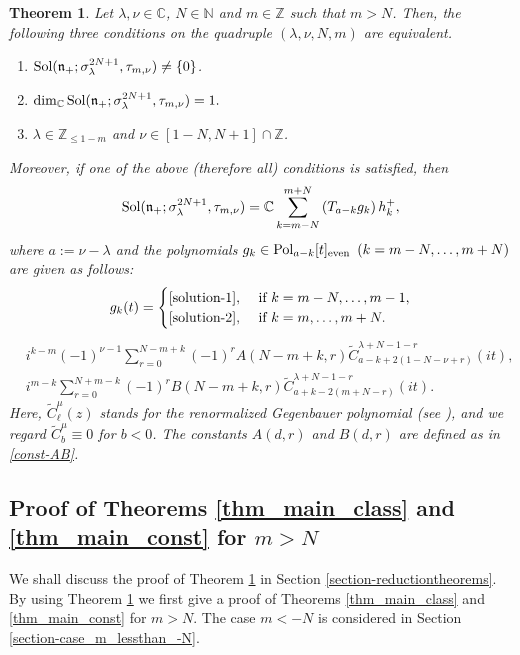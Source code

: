 \documentclass[12pt, pdflatex, a4paper]{article}
\theoremstyle{plain}
\newtheorem{thm}{Theorem}[section]
\theoremstyle{definition}
\def\C{{\mathbb C}}
\def\Geg{\widetilde{C}}
\def\N{{\mathbb N}}
\def\n{\mathfrak{n}}
\def\Pol{\text{\normalfont{Pol}}}
\def\Sol{\text{\normalfont{Sol}}}
\def\Z{{\mathbb Z}}
\begin{document}
\begin{thm}\label{thm-step2} Let $\lambda, \nu \in \C$, $N \in \N$ and $m\in \Z$ such that $m > N$. Then, the following three conditions on the quadruple $(\lambda, \nu, N, m)$ are equivalent.
\begin{enumerate}[label=\normalfont{(\roman*)}, topsep=3pt]
\item $\Sol(\n_+; \sigma_\lambda^{2N+1}, \tau_{m, \nu}) \neq \{0\}$.
\item $\dim_\C \Sol(\n_+; \sigma_\lambda^{2N+1}, \tau_{m, \nu}) = 1.$
\item $\lambda \in \Z_{\leq 1-m}$ and $\nu \in [1-N, N+1]\cap \Z$.
\end{enumerate}
Moreover, if one of the above (therefore all) conditions is satisfied, then
\begin{equation*}
\Sol(\n_+; \sigma_\lambda^{2N+1}, \tau_{m, \nu}) = \C\sum_{k = m-N}^{m+N}\left(T_{a -k}g_k\right)h_k^+,
\end{equation*}
where $a := \nu - \lambda$ and the polynomials $g_{k} \in \Pol_{a-k}[t]_\text{even} \enspace (k = m-N, \dots, m+N)$ are given as follows:
\begin{equation}\label{solution-all}
g_k(t) = \begin{cases}
\eqref{solution-1}, & \text{ if } k= m-N, \ldots, m-1,\\
\eqref{solution-2}, & \text{ if } k=m, \ldots, m+N.
\end{cases}
\end{equation}
\begin{align}
\label{solution-1}
& i^{k-m}(-1)^{\nu-1}\sum_{r=0}^{N-m+k} (-1)^rA(N-m+k, r)\Geg_{a-k+2(1-N-\nu+r)}^{\lambda+N-1-r}(it),\\
\label{solution-2}
& i^{m-k}\sum_{r=0}^{N+m-k} (-1)^rB(N-m+k, r)\Geg_{a+k-2(m+N-r)}^{\lambda+N-1-r}(it).
\end{align}
Here, $\widetilde{C}_\ell^\mu(z)$ stands for the renormalized Gegenbauer polynomial (see {\normalfont{(\ref{Gegenbauer-polynomial(renormalized)})}}), and we regard $\widetilde{C}_b^\mu \equiv 0$ for $b < 0$. The constants $A(d,r)$ and $B(d,r)$ are defined as in \eqref{const-AB}.
\end{thm}

\subsection{Proof of Theorems \ref{thm_main_class} and \ref{thm_main_const} for $m > N$}\label{section-proof-mainthms}
We shall discuss the proof of Theorem \ref{thm-step2} in Section \ref{section-reductiontheorems}. By using Theorem \ref{thm-step2} we first give a proof of Theorems \ref{thm_main_class} and \ref{thm_main_const} for $m > N$. The case $m < -N$ is considered in Section \ref{section-case_m_lessthan_-N}.
\end{document}
